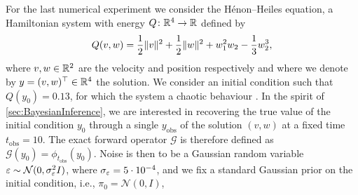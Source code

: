 \documentclass[10pt]{article}
\begin{document}
For the last numerical experiment we consider the Hénon--Heiles equation, a Hamiltonian system with energy $Q\colon \mathbb{R}^4 \to \mathbb{R}$ defined by
\begin{equation}\label{eq:HamHH}
	Q(v, w) = \frac{1}{2}\lVert v\rVert^2 + \frac{1}{2}\lVert w\rVert^2 + w_1^2w_2 - \frac{1}{3}w_2^3,
\end{equation} 
where $v, w \in \mathbb{R}^2$ are the velocity and position respectively and where we denote by $y = (v, w)^\top \in \mathbb{R}^4$ the solution. We consider an initial condition such that $Q(y_0) = 0.13$, for which the system  a chaotic behaviour \cite{HeH64}. In the spirit of \cref{sec:BayesianInference}, we are interested in recovering the true value of the initial condition $y_0$ through a single  $y_{\mathrm{obs}}$ of the solution $(v, w)$ at a fixed time $t_{\mathrm{obs}} = 10$. The exact forward operator $\mathcal{G}$ is therefore defined as $\mathcal{G}(y_0) = \phi_{t_{\mathrm{obs}}}(y_0)$. Noise is then  to be a Gaussian random variable $\varepsilon \sim \mathcal{N}(0, \sigma_\varepsilon^2 I)$, where $\sigma_\varepsilon = 5 \cdot 10^{-4}$, and we fix a standard Gaussian prior on the initial condition, i.e., $\pi_0 = \mathcal N(0, I)$, 
\end{document}
